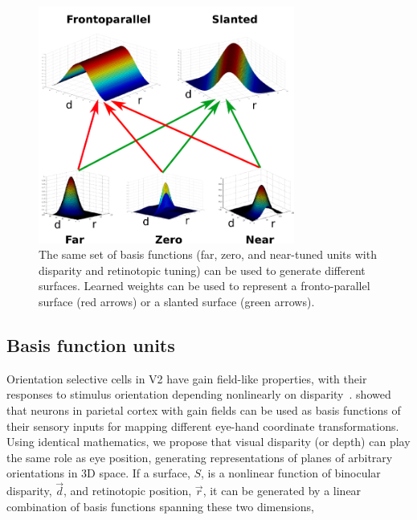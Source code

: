\begin{figure}[t]
\centering
\includegraphics[width=0.75\textwidth]{3D-Surface/figs/basisfunc_new.png}
\makeatletter
\let\@currsize\normalsize
\caption[Basis functions can flexibly represent different surfaces using learned weights]{The same set of basis functions (\eg far, zero, and near-tuned units with disparity and retinotopic tuning) can be used to generate different surfaces. Learned weights can be used to represent a fronto-parallel surface (red arrows) or a slanted surface (green arrows).}
\label{Basis functions}
\end{figure}

\subsection{Basis function units}
\label{sec:basis_func}

Orientation selective cells in V2 have gain field-like properties, with their responses to stimulus orientation depending nonlinearly on disparity~\citep{vonderHeydt_etal00a}.
\citet{Pouget_Sejnowski97b} showed that neurons in parietal cortex with gain fields can be used as basis functions of their sensory inputs for mapping different eye-hand coordinate transformations. Using identical mathematics, we propose that visual disparity (or depth) can play the same role as eye position, generating representations of planes of arbitrary orientations in 3D space. If a surface, $S$, is a nonlinear function of binocular disparity, $\vec{d}$, and retinotopic position, $\vec{r}$, it can be generated by a linear combination of basis functions spanning these two dimensions,

